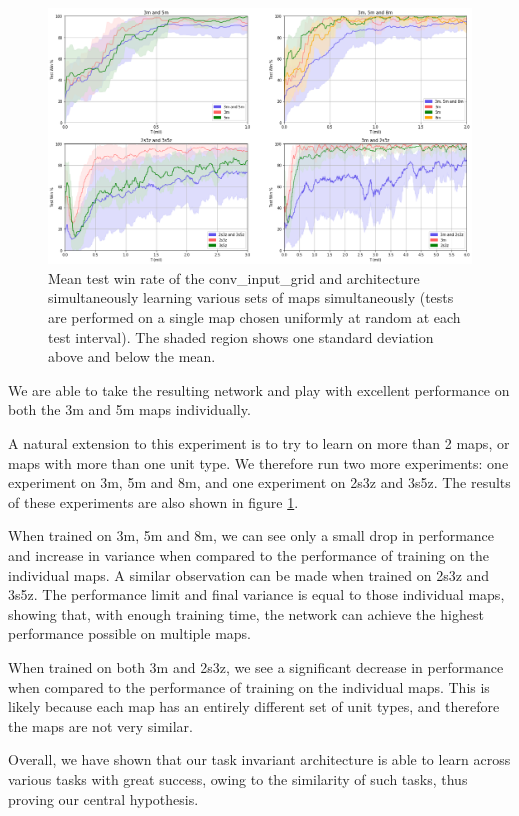 \begin{figure}[h]
    \centering
    \hbox{\hspace{-5em}\includegraphics[width=1.2\textwidth]{images/graphs/all.png}}
    \caption{Mean test win rate of the conv\_input\_grid and architecture simultaneously learning various sets of maps simultaneously (tests are performed on a single map chosen uniformly at random at each test interval). The shaded region shows one standard deviation above and below the mean.}
    \label{fig:reptileall}
\end{figure}


We are able to take the resulting network and play with excellent performance on both the 3m and 5m maps individually. 

A natural extension to this experiment is to try to learn on more than 2 maps, or maps with more than one unit type. We therefore run two more experiments: one experiment on 3m, 5m and 8m, and one experiment on 2s3z and 3s5z. The results of these experiments are also shown in figure \ref{fig:reptileall}.



When trained on 3m, 5m and 8m, we can see only a small drop in performance and increase in variance when compared to the performance of training on the individual maps. A similar observation can be made when trained on 2s3z and 3s5z. The performance limit and final variance is equal to those individual maps, showing that, with enough training time, the network can achieve the highest performance possible on multiple maps.

When trained on both 3m and 2s3z, we see a significant decrease in performance when compared to the performance of training on the individual maps. This is likely because each map has an entirely different set of unit types, and therefore the maps are not very similar.

Overall, we have shown that our task invariant architecture is able to learn across various tasks with great success, owing to the similarity of such tasks, thus proving our central hypothesis.